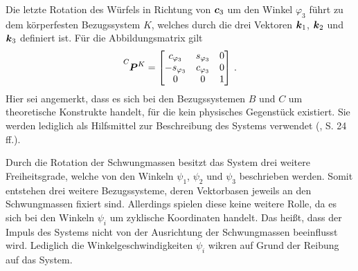 Die letzte Rotation des Würfels in Richtung von $\boldsymbol{c}_3$ um den Winkel $\varphi_3$ führt zu dem körperfesten Bezugssystem $K$, welches durch die drei Vektoren $\boldsymbol{k}_1$, $\boldsymbol{k}_2$ und $\boldsymbol{k}_3$ definiert ist. Für die Abbildungsmatrix gilt 
\begin{equation}
\pMat{C}{K} = \begin{bmatrix}
c_{\varphi_3} & s_{\varphi_3} & 0 \\ -s_{\varphi_3} & c_{\varphi_3} & 0 \\ 0 & 0 & 1
\end{bmatrix} \,.
\end{equation}
Hier sei angemerkt, dass es sich bei den Bezugssystemen $B$ und $C$ um theoretische Konstrukte handelt, für die kein physisches Gegenstück existiert. Sie werden lediglich als Hilfsmittel zur Beschreibung des Systems verwendet (\cite{KaneBook}, S. 24 ff.).

Durch die Rotation der Schwungmassen besitzt das System drei weitere Freiheitsgrade, welche von den Winkeln $\psi_1$, $\psi_2$ und $\psi_3$ beschrieben werden. Somit entstehen drei weitere Bezugssysteme, deren Vektorbasen jeweils an den Schwungmassen fixiert sind. Allerdings spielen diese keine weitere Rolle, da es sich bei den Winkeln $\psi_i$ um zyklische Koordinaten handelt. Das heißt, dass der Impuls des Systems nicht von der Ausrichtung der Schwungmassen beeinflusst wird. Lediglich die Winkelgeschwindigkeiten $\dot{\psi}_i$ wikren auf Grund der Reibung auf das System.

